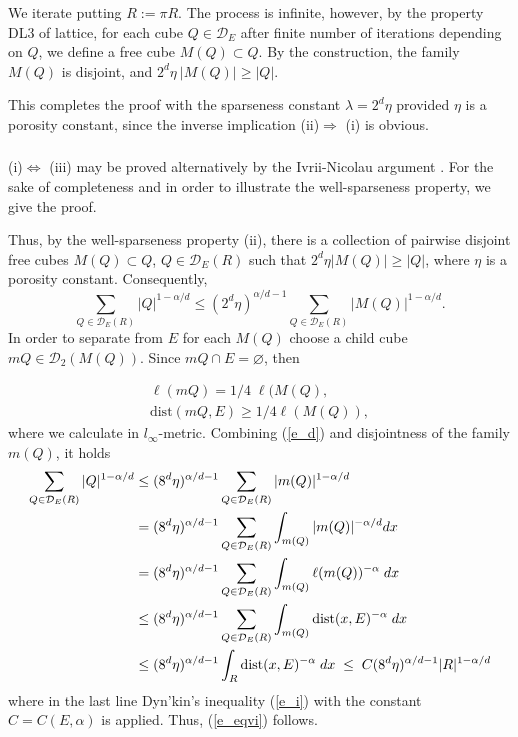\documentclass[12pt]{amsart} \setlength{\textwidth}{15cm} \setlength{\textheight}{24cm} \setlength{\voffset}{-1cm} \setlength{\oddsidemargin}{-0.4cm} \setlength{\evensidemargin}{-0.4cm}
\theoremstyle{definition}
\theoremstyle{remark}
\begin{document}
   We iterate putting
$R:=\pi  R$.
       The process is infinite, however,    by the property DL3 of lattice,  for each cube $Q \in \mathcal{D}_E$ after finite number of iterations depending on $Q$,  we define a free cube  $M(Q)\subset Q$. By the construction,  the family $M(Q)$ is disjoint,
  and $2^d \eta \:| M(Q)| \geq |Q|$.

   This completes the proof with the sparseness constant $\lambda = 2^d \eta$ provided $\eta$ is a porosity constant,
since the inverse implication
(ii)$\Rightarrow$ (i) is obvious.

\subsubsection{}
(i)$\Leftrightarrow$ (iii)  may be proved alternatively by the Ivrii-Nicolau argument \cite[Lemma 3.1]{IN}. For the sake of completeness and in order to illustrate    the well-sparseness property, we give the proof.

Thus, 
 by the well-sparseness property (ii), there is a collection  of
    pairwise disjoint free cubes  $ M(Q) \subset Q$, $ Q \in \mathcal{D}_E(R)$
  such that    $2^d\eta|M(Q)|\geq  |Q|$, where $\eta$ is a  porosity constant. Consequently,
   \[
\sum_{Q \in \mathcal{D}_E(R)}|Q|^{1-\alpha /d}\leq (2^d\eta)^{\alpha/d-1} \sum_{Q \in \mathcal{D}_E(R)}|M(Q)|^{1-\alpha/d}.
\]
  In order to separate from $E$  for each $M(Q)$ choose a child cube $mQ \in \mathcal{D}_2(M(Q))$. Since $mQ \cap E =\varnothing$, then
 

 \begin{align}
   \ell (mQ)=1/4\; \ell (M(Q),\label{e_d}\\
    \mathrm{dist} (mQ, E) \geq 1/4 \ell (M(Q)), \label{e_d1}
 \end{align}
  where we calculate in   $l_{\infty}$-metric. Combining (\ref{e_d}) and disjointness
  of the family $m(Q)$, it holds
    \[
   \aligned
\sum_{Q \in \mathcal{D}_E(R)}|Q|^{1-\alpha/d}
&\leq (8^d \eta)^{\alpha/d-1} \sum_{Q \in \mathcal{D}_E(R)}|m(Q)|^{1-\alpha/d}\\
& =(8^d \eta)^{\alpha/d-1} \sum_{Q \in \mathcal{D}_E(R)}\int_{m(Q)}|m(Q)|^{-\alpha/d} dx\\
& = (8^d \eta)^{\alpha/d-1} \sum_{Q \in \mathcal{D}_E(R)}\int_{m(Q)}\ell(m(Q))^{-\alpha } \;dx\\
&\leq(8^d \eta)^{\alpha/d-1}\sum_{Q \in \mathcal{D}_E(R)}\int_{m(Q)}\mathrm{dist} (x,E)^{-\alpha } \;dx\\
& \leq(8^d \eta)^{\alpha/d-1}\int_{R}\mathrm{dist} (x,E)^{-\alpha }\; dx
\;\leq \;C (8^d \eta)^{\alpha/d-1} |R|^{1-\alpha/d}\\
\endaligned
\]
where in the last line Dyn'kin's inequality (\ref{e_i}) with the constant $C=C(E,\alpha)$  is applied.
Thus, (\ref{e_eqvi}) follows.
\end{document}

